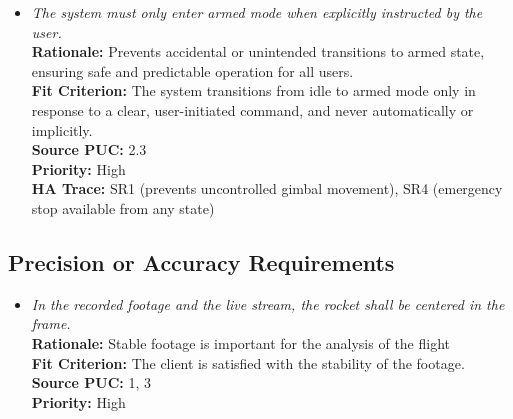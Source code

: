 \documentclass[12pt]{article}
\begin{document}
\begin{itemize}[leftmargin=*]
  \item[SCR-4] \emph{The system must only enter armed mode when explicitly instructed
          by the user.}\\[2mm]
        \textbf{Rationale:} Prevents accidental or unintended transitions to armed state, ensuring safe and predictable operation for all users.\\
        \textbf{Fit Criterion:} The system transitions from idle to armed mode only in response to a clear, user-initiated command, and never automatically or implicitly.\\
        \textbf{Source PUC:} 2.3 \\
        \textbf{Priority:} High \\
        \textbf{HA Trace:} SR1 (prevents uncontrolled gimbal movement), SR4 (emergency stop available from any state)
\end{itemize}

\subsection{Precision or Accuracy Requirements}
\begin{itemize}[leftmargin=*]
  \item[PAR-1] \emph{In the recorded footage and the live stream, the rocket shall be
          centered in the frame.}\\[2mm]
        \textbf{Rationale:} Stable footage is important for the analysis of the flight\\
        \textbf{Fit Criterion:} The client is satisfied with the stability of the footage.\\
        \textbf{Source PUC:} 1, 3 \\
        \textbf{Priority:} High
\end{itemize}
\end{document}
